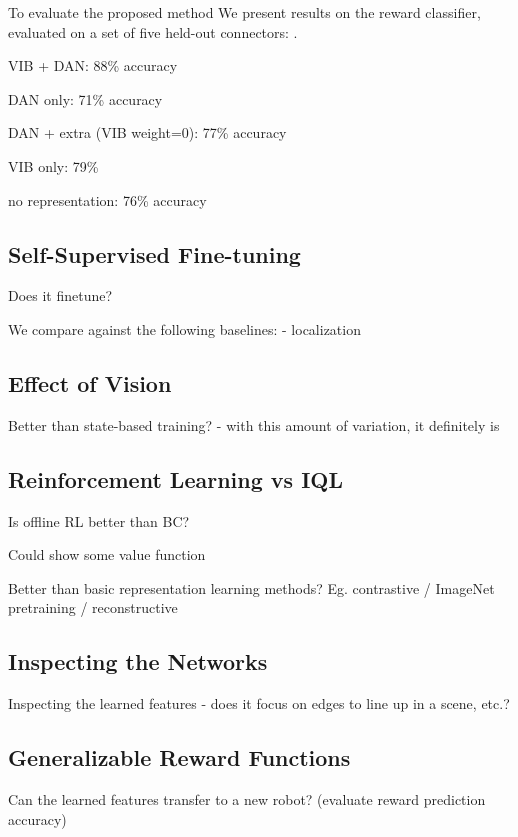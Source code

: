 \documentclass{article}
\begin{document}
To evaluate the proposed method 
We present results on the reward classifier, evaluated on a set of five held-out connectors: .

VIB + DAN: 88\% accuracy 

DAN only: 71\% accuracy

DAN + extra (VIB weight=0): 77\% accuracy

VIB only: 79\%

no representation: 76\% accuracy

\subsection{Self-Supervised Fine-tuning}

Does it finetune?

We compare against the following baselines:
- localization

\subsection{Effect of Vision}

Better than state-based training? - with this amount of variation, it definitely is

\subsection{Reinforcement Learning vs IQL}

Is offline RL better than BC?

Could show some value function

Better than basic representation learning methods? Eg. contrastive / ImageNet pretraining / reconstructive

\subsection{Inspecting the Networks}

Inspecting the learned features - does it focus on edges to line up in a scene, etc.?

\subsection{Generalizable Reward Functions}

Can the learned features transfer to a new robot? (evaluate reward prediction accuracy)
\end{document}

